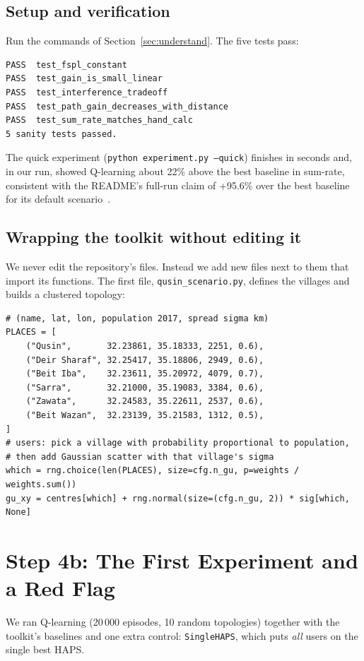 \documentclass[11pt,a4paper]{article}
\begin{document}
\subsection{Setup and verification}
Run the commands of Section~\ref{sec:understand}. The five tests pass:
\begin{lstlisting}
PASS  test_fspl_constant
PASS  test_gain_is_small_linear
PASS  test_interference_tradeoff
PASS  test_path_gain_decreases_with_distance
PASS  test_sum_rate_matches_hand_calc
5 sanity tests passed.
\end{lstlisting}
The quick experiment (\texttt{python experiment.py --quick}) finishes in seconds and, in our run, showed Q-learning about 22\% above the best baseline in sum-rate, consistent with the README's full-run claim of +95.6\% over the best baseline for its default scenario~\cite{repo}.

\subsection{Wrapping the toolkit without editing it}
We never edit the repository's files. Instead we add new files next to them that import its functions. The first file, \texttt{qusin\_scenario.py}, defines the villages and builds a clustered topology:
\begin{lstlisting}
# (name, lat, lon, population 2017, spread sigma km)
PLACES = [
    ("Qusin",       32.23861, 35.18333, 2251, 0.6),
    ("Deir Sharaf", 32.25417, 35.18806, 2949, 0.6),
    ("Beit Iba",    32.23611, 35.20972, 4079, 0.7),
    ("Sarra",       32.21000, 35.19083, 3384, 0.6),
    ("Zawata",      32.24583, 35.22611, 2537, 0.6),
    ("Beit Wazan",  32.23139, 35.21583, 1312, 0.5),
]
# users: pick a village with probability proportional to population,
# then add Gaussian scatter with that village's sigma
which = rng.choice(len(PLACES), size=cfg.n_gu, p=weights / weights.sum())
gu_xy = centres[which] + rng.normal(size=(cfg.n_gu, 2)) * sig[which, None]
\end{lstlisting}

\section{Step 4b: The First Experiment and a Red Flag}
\label{sec:firstrun}

We ran Q-learning (20\,000 episodes, 10 random topologies) together with the toolkit's baselines and one extra control: \texttt{SingleHAPS}, which puts \emph{all} users on the single best HAPS.
\end{document}
